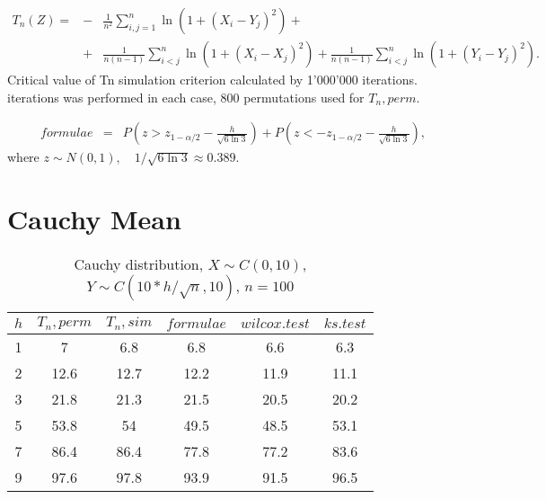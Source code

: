 \documentclass{svproc}
\begin{document}
\begin{eqnarray*}
  T_n(Z) = &-&\frac{1}{n^2}\sum_{i,j=1}^n\ln(1+(X_i-Y_j)^2)+ \\
           &+&\frac{1}{n(n-1)}\sum_{i<j}^n\ln(1+(X_i-X_j)^2)+\frac{1}{n(n-1)}\sum_{i<j}^n\ln(1+(Y_i-Y_j)^2).
\end{eqnarray*}
Critical value of Tn simulation criterion calculated by 1'000'000 iterations.
 iterations was performed in each case, 800 permutations used for $T_n, perm$.

\begin{eqnarray*}
  formulae &=& P(z > z_{1-\alpha/2} - \frac{h}{\sqrt{6\ln 3}}) + P(z < -z_{1-\alpha/2} - \frac{h}{\sqrt{6\ln 3}}),
\end{eqnarray*}
where $z\sim N(0,1),\quad 1/\sqrt{6\ln 3}\approx 0.389$.

\section*{Cauchy Mean}

\begin{table}
  \caption{Cauchy distribution, $X\sim C(0,10)$, $Y\sim C(10*h/\sqrt{n},10)$, $n=100$}
  \begin{center}
  \begin{tabular}{c@{\quad}c@{\quad}c@{\quad}c@{\quad}c@{\quad}c}
  \hline
  $h$ & $T_n, perm$ & $T_n, sim$ & $formulae$ & $wilcox.test$ & $ks.test$ \\
  \hline
  1 & 7 & 6.8 & 6.8 & 6.6 & 6.3 \\
  2 & 12.6 & 12.7 & 12.2 & 11.9 & 11.1 \\
  3 & 21.8 & 21.3 & 21.5 & 20.5 & 20.2 \\
  5 & 53.8 & 54 & 49.5 & 48.5 & 53.1 \\
  7 & 86.4 & 86.4 & 77.8 & 77.2 & 83.6 \\
  9 & 97.6 & 97.8 & 93.9 & 91.5 & 96.5 \\
  \hline
  \end{tabular}
  \end{center}
\end{table}
\end{document}
